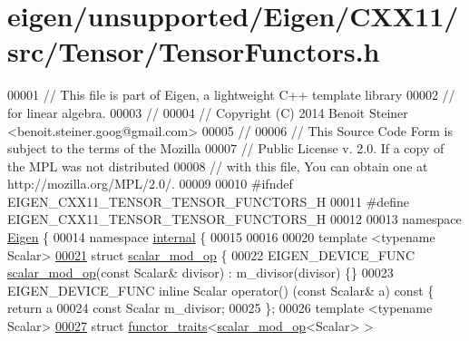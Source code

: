 \hypertarget{eigen_2unsupported_2_eigen_2_c_x_x11_2src_2_tensor_2_tensor_functors_8h_source}{}\section{eigen/unsupported/\+Eigen/\+C\+X\+X11/src/\+Tensor/\+Tensor\+Functors.h}
\label{eigen_2unsupported_2_eigen_2_c_x_x11_2src_2_tensor_2_tensor_functors_8h_source}

\begin{DoxyCode}
00001 \textcolor{comment}{// This file is part of Eigen, a lightweight C++ template library}
00002 \textcolor{comment}{// for linear algebra.}
00003 \textcolor{comment}{//}
00004 \textcolor{comment}{// Copyright (C) 2014 Benoit Steiner <benoit.steiner.goog@gmail.com>}
00005 \textcolor{comment}{//}
00006 \textcolor{comment}{// This Source Code Form is subject to the terms of the Mozilla}
00007 \textcolor{comment}{// Public License v. 2.0. If a copy of the MPL was not distributed}
00008 \textcolor{comment}{// with this file, You can obtain one at http://mozilla.org/MPL/2.0/.}
00009 
00010 \textcolor{preprocessor}{#ifndef EIGEN\_CXX11\_TENSOR\_TENSOR\_FUNCTORS\_H}
00011 \textcolor{preprocessor}{#define EIGEN\_CXX11\_TENSOR\_TENSOR\_FUNCTORS\_H}
00012 
00013 \textcolor{keyword}{namespace }\hyperlink{namespace_eigen}{Eigen} \{
00014 \textcolor{keyword}{namespace }\hyperlink{namespaceinternal}{internal} \{
00015 
00016 
00020 \textcolor{keyword}{template} <\textcolor{keyword}{typename} Scalar>
\hyperlink{struct_eigen_1_1internal_1_1scalar__mod__op}{00021} \textcolor{keyword}{struct }\hyperlink{struct_eigen_1_1internal_1_1scalar__mod__op}{scalar\_mod\_op} \{
00022   EIGEN\_DEVICE\_FUNC \hyperlink{struct_eigen_1_1internal_1_1scalar__mod__op}{scalar\_mod\_op}(\textcolor{keyword}{const} Scalar& divisor) : m\_divisor(divisor) \{\}
00023   EIGEN\_DEVICE\_FUNC \textcolor{keyword}{inline} Scalar operator() (\textcolor{keyword}{const} Scalar& a)\textcolor{keyword}{ const }\{ \textcolor{keywordflow}{return} a %
00024   \textcolor{keyword}{const} Scalar m\_divisor;
00025 \};
00026 \textcolor{keyword}{template} <\textcolor{keyword}{typename} Scalar>
\hyperlink{struct_eigen_1_1internal_1_1functor__traits_3_01scalar__mod__op_3_01_scalar_01_4_01_4}{00027} \textcolor{keyword}{struct }\hyperlink{struct_eigen_1_1internal_1_1functor__traits}{functor\_traits}<\hyperlink{struct_eigen_1_1internal_1_1scalar__mod__op}{scalar\_mod\_op}<Scalar> >

\end{DoxyCode}
